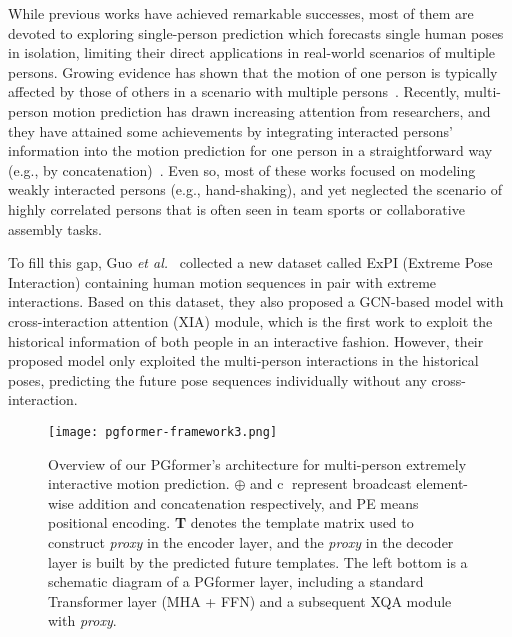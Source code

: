 \documentclass[10pt,twocolumn,letterpaper]{article}
\begin{document}
While previous works have achieved remarkable successes, most of them are devoted to exploring single-person prediction which forecasts single human poses in isolation, limiting their direct applications in real-world scenarios of multiple persons. 
Growing evidence has shown that the motion of one person is typically affected by those of others in a scenario with multiple persons~\cite{wang2021multiperson}. 
Recently, multi-person motion prediction has drawn increasing attention from researchers, 
and they have attained some achievements by integrating interacted persons' information into the motion prediction for one person in a straightforward way (e.g., by concatenation)~\cite{wang2021multiperson, Vendrow2022SoMoFormer, Adeli2021TRiPOD}.
Even so, most of these works focused on modeling weakly interacted persons (e.g., hand-shaking), and yet neglected the scenario of highly correlated persons that is often seen in team sports or collaborative assembly tasks. 


To fill this gap, 
Guo \textit{et al.}~\cite{guo2021multi} collected a new dataset called ExPI (Extreme Pose Interaction) containing human motion sequences in pair with extreme interactions. 
Based on this dataset, they also proposed a GCN-based model with cross-interaction attention (XIA) module, which is the first work to exploit the historical information of both people in an interactive fashion. 
However, their proposed model only exploited the multi-person interactions in the historical poses, predicting the future pose sequences individually without any cross-interaction.


\begin{figure*}[ht]
    \vskip -0.1in
	\begin{center}
		\centerline{\texttt{[image: pgformer-framework3.png]}} \caption{Overview of our PGformer's architecture for multi-person extremely interactive motion prediction. $\oplus$ and \textcircled{c} represent broadcast element-wise addition and concatenation respectively, and PE means positional encoding. \textbf{T} denotes the template matrix used to construct \textit{proxy} in the encoder layer, and the \textit{proxy} in the decoder layer is built by the predicted future templates. The left bottom is a schematic diagram of a PGformer layer, including a standard Transformer layer (MHA + FFN) and a subsequent XQA module with \textit{proxy}. 
        }
		\label{fig:framework}
	\end{center}
  \vskip -0.4in
\end{figure*}
\end{document}
